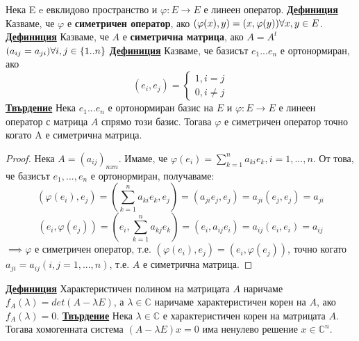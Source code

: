 \documentclass{article}
\begin{document}
Нека E e евклидово пространство и $\varphi: E \rightarrow E$ е линеен оператор. \newline\newline
\textbf{\underline{Дефиниция}}
Казваме, че $\varphi$ е \textbf{симетричен оператор}, ако $(\varphi(x), y) = (x, \varphi(y)) \newline \forall x, y \in E$. \newline\newline
\textbf{\underline{Дефиниция}}
Казваме, че $A$ е \textbf{симетрична матрица}, ако $A = A^t$ $(a_{ij} = a_{ji}) \newline \forall i, j \in \{1..n\}$ \newline\newline
\textbf{\underline{Дефиниция}}
Казваме, че базисът $e_1 ... e_n$ е ортонормиран, ако $$(e_i, e_j) = \begin{cases}
    1, i = j \\
    0, i \neq j
\end{cases}$$
\textbf{\underline{Твърдение}} \newline
Нека $e_1 ... e_n$ е ортонормиран базис на $E$ и $\varphi : E \rightarrow E$ е линеен оператор с матрица $A$ спрямо този базис.
Тогава $\varphi$ е симетричен оператор точно когато A е симетрична матрица.
\begin{proof}
Нека $A = (a_{ij})_{nxn}$. Имаме, че $\varphi(e_i) = \sum_{k=1}^{n}a_{ki}e_k, i = 1, ..., n$. От това, че базисът $e_1, ..., e_n$ е
ортонормиран, получаваме: $$(\varphi(e_i), e_j) = (\sum_{k=1}^{n}a_{ki}e_k, e_j) = (a_{ji}e_j, e_j) = a_{ji}(e_j, e_j) = a_{ji}$$
$$(e_i, \varphi(e_j)) = (e_i, \sum_{k=1}^{n}a_{kj}e_k) = (e_i, a_{ij}e_i) = a_{ij}(e_i, e_i) = a_{ij}$$
$\implies \varphi$ е симетричен оператор, т.е. $(\varphi(e_i), e_j) = (e_i, \varphi(e_j))$, точно когато $a_{ji} = a_{ij}
(i, j = 1, ..., n)$, т.е. $A$ е симетрична матрица.
\end{proof}
\textbf{\underline{Дефиниция}}
Характеристичен полином на матрицата $A$ наричаме $f_A(\lambda) = det(A - \lambda E)$, а $\lambda \in \mathbb{C}$ наричаме характеристичен корен на
$A$, ако $f_A(\lambda) = 0$. \newline\newline
\textbf{\underline{Твърдение}} \newline
Нека $\lambda \in \mathbb{C}$ е характеристичен корен на матрицата $A$. Тогава хомогенната система $(A - \lambda E)x = 0$ има ненулево решение $x \in \mathbb{C}^n$. \newline\newline
\end{document}
